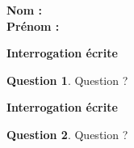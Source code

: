 \documentclass[11pt,a4paper,landscape]{article}
\newcommand{\Pointilles}[1]
    {%
      \multido{}{#1}{\phantom{}\dotfill\\}
    }
\theoremstyle{definition}
\newtheorem{question}{Question}
\begin{document}
    \newsavebox{\boitename}
    \begin{lrbox}{\boitename}%
      \begin{minipage}{.4\textwidth}
        \large
        \bf{Nom :}\\
        \bf{Prénom :}
      \end{minipage}
    \end{lrbox}
    \begin{center}
      \fbox{\usebox{\boitename}}
    \end{center}

    \bigskip

    \begin{multicols}{2}
      \begin{center}
        \large\bf{Interrogation \'{e}crite}
      \end{center}
      \normalsize\bigskip

      \begin{question}
        Question ?
        \Pointilles{6}
      \end{question}

      \columnbreak
      \begin{center}
        \large\bf{Interrogation \'{e}crite}
      \end{center}
      \normalsize\bigskip

      \begin{question}
        Question ?
        \Pointilles{6}
      \end{question}
    \end{multicols}
    
\end{document}
